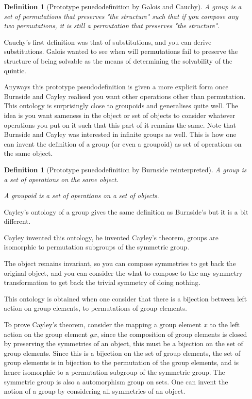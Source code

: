 \documentclass{tufte-book}
\newtheorem{definition}[theorem]{Definition}
\begin{document}
\begin{definition}[Prototype psuedodefinition by Galois and Cauchy]
A group is a set of permutations that preserves "the structure" such that if you compose any two permutations, it is still a permutation that preserves "the structure".
\end{definition}

Cauchy's first definition was that of substitutions, and you can derive substitutions. Galois wanted to see when will permutations fail to preserve the structure of being solvable as the means of determining the solvability of the quintic.

Anyways this prototype pseudodefinition is given a more explicit form once Burnside and Cayley realised you want other operations other than permutation. This ontology is surprisingly close to groupoids and generalises quite well. The idea is you want sameness in the object or set of objects to consider whatever operations you put on it such that this part of it remains the same. Note that Burnside and Cayley was interested in infinite groups as well. This is how one can invent the definition of a group (or even a groupoid) as set of operations on the same object.

\begin{definition}[Prototype psuedodefinition by Burnside reinterpreted]
A group is a set of operations on the same object.

A groupoid is a set of operations on a set of objects.
\end{definition}

Cayley's ontology of a group gives the same definition as Burnside's but it is a bit different.

Cayley invented this ontology, he invented Cayley's theorem, groups are isomorphic to permutation subgroups of the symmetric group. 

The object remains invariant, so you can compose symmetries to get back the original object, and you can consider the what to compose to the any symmetry transformation to get back the trivial symmetry of doing nothing. 

This ontology is obtained when one consider that there is a bijection between left action on group elements, to permutations of group elements. 

To prove Cayley's theorem, consider the mapping a group element $x$ to the left action on the group element $gx$, since the composition of group elements is closed by preserving the symmetries of an object, this must be a bijection on the set of group elements. Since this is a bijection on the set of group elements, the set of group elements is in bijection to the permutation of the group elements, and is hence isomorphic to a permutation subgroup of the symmetric group. The symmetric group is also a automorphism group on sets. One can invent the notion of a group by considering all symmetries of an object.
\end{document}
